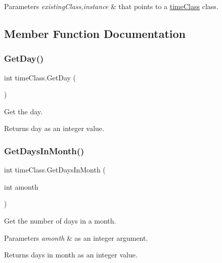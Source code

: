\begin{DoxyParams}{Parameters}
{\em existing\+Class,instance} & that points to a \mbox{\hyperlink{classtime_class}{time\+Class}} class. \\
\hline
\end{DoxyParams}


\subsection{Member Function Documentation}
\mbox{\label{classtime_class_aa593aee7c9ef8d70716e1f9fb3206545}} 
\subsubsection{\texorpdfstring{GetDay()}{GetDay()}}
{\footnotesize\ttfamily int time\+Class.\+Get\+Day (\begin{DoxyParamCaption}{ }\end{DoxyParamCaption})\hspace{0.3cm}{\ttfamily [inline]}}



Get the day. 

\begin{DoxyReturn}{Returns}
day as an integer value. 
\end{DoxyReturn}
\mbox{\label{classtime_class_a32dd8f1721ce77bac40e301d14805be4}} 
\subsubsection{\texorpdfstring{GetDaysInMonth()}{GetDaysInMonth()}}
{\footnotesize\ttfamily int time\+Class.\+Get\+Days\+In\+Month (\begin{DoxyParamCaption}\item[{int}]{amonth }\end{DoxyParamCaption})\hspace{0.3cm}{\ttfamily [inline]}}



Get the number of days in a month. 


\begin{DoxyParams}{Parameters}
{\em amonth} & as an integer argument. \\
\hline
\end{DoxyParams}
\begin{DoxyReturn}{Returns}
days in month as an integer value. 
\end{DoxyReturn}
\mbox{\label{classtime_class_a56c018f6d4c6da5e8bc48cc4c7229d86}} 
